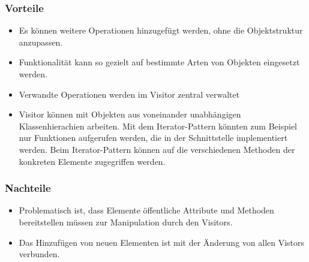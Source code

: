 \subsubsection{Vorteile}
\begin{itemize}
\item Es können weitere Operationen hinzugefügt werden, ohne die Objektstruktur anzupassen.
\item Funktionalität kann so gezielt auf bestimmte Arten von Objekten eingesetzt werden.
\item Verwandte Operationen werden im Visitor zentral verwaltet
\item Visitor können mit Objekten aus voneinander unabhängigen Klassenhierachien arbeiten. Mit dem Iterator-Pattern könnten zum Beispiel nur Funktionen aufgerufen werden, die in der Schnittstelle implementiert werden. Beim Iterator-Pattern können auf die verschiedenen Methoden der konkreten Elemente zugegriffen werden.
\end{itemize}
\subsubsection{Nachteile}
\begin{itemize}

\item Problematisch ist, dass Elemente öffentliche Attribute und Methoden bereitstellen müssen zur Manipulation durch den Visitors. 
\item Das Hinzufügen von neuen Elementen ist mit der Änderung von allen Vistors verbunden.
\end{itemize}